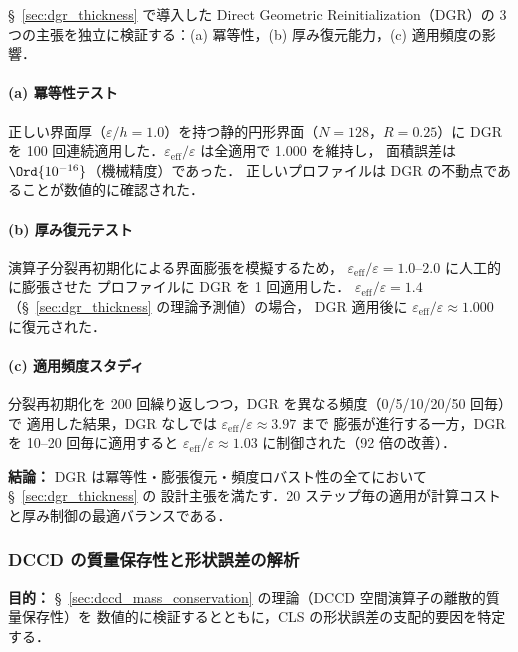 §~\ref{sec:dgr_thickness} で導入した Direct Geometric Reinitialization（DGR）の
3 つの主張を独立に検証する：(a) 冪等性，(b) 厚み復元能力，(c) 適用頻度の影響．

\paragraph{(a) 冪等性テスト}
正しい界面厚（$\varepsilon/h = 1.0$）を持つ静的円形界面（$N = 128$，$R = 0.25$）に
DGR を 100 回連続適用した．$\varepsilon_{\mathrm{eff}}/\varepsilon$ は全適用で 1.000 を維持し，
面積誤差は $\Ord{10^{-16}}$（機械精度）であった．
正しいプロファイルは DGR の不動点であることが数値的に確認された．

\paragraph{(b) 厚み復元テスト}
演算子分裂再初期化による界面膨張を模擬するため，
$\varepsilon_{\mathrm{eff}}/\varepsilon = 1.0$--$2.0$ に人工的に膨張させた
プロファイルに DGR を 1 回適用した．
$\varepsilon_{\mathrm{eff}}/\varepsilon = 1.4$（§~\ref{sec:dgr_thickness} の理論予測値）の場合，
DGR 適用後に $\varepsilon_{\mathrm{eff}}/\varepsilon \approx 1.000$ に復元された．

\paragraph{(c) 適用頻度スタディ}
分裂再初期化を 200 回繰り返しつつ，DGR を異なる頻度（0/5/10/20/50 回毎）で
適用した結果，DGR なしでは $\varepsilon_{\mathrm{eff}}/\varepsilon \approx 3.97$ まで
膨張が進行する一方，DGR を 10--20 回毎に適用すると
$\varepsilon_{\mathrm{eff}}/\varepsilon \approx 1.03$ に制御された（92 倍の改善）．

\noindent\textbf{結論：}
DGR は冪等性・膨張復元・頻度ロバスト性の全てにおいて §~\ref{sec:dgr_thickness} の
設計主張を満たす．20 ステップ毎の適用が計算コストと厚み制御の最適バランスである．

\subsubsection{DCCD の質量保存性と形状誤差の解析}
\label{sec:verify_dccd_conservation}

\noindent\textbf{目的：}
§~\ref{sec:dccd_mass_conservation} の理論（DCCD 空間演算子の離散的質量保存性）を
数値的に検証するとともに，CLS の形状誤差の支配的要因を特定する．

